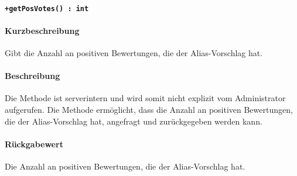 \paragraph*{\texttt{+getPosVotes() : int}}%
\paragraph*{Kurzbeschreibung}
Gibt die Anzahl an positiven Bewertungen, die der Alias-Vorschlag hat.
\paragraph*{Beschreibung}
Die Methode ist serverintern und wird somit nicht explizit vom Administrator aufgerufen.
Die Methode ermöglicht, dass die Anzahl an positiven Bewertungen, die der Alias-Vorschlag hat, angefragt und zurückgegeben werden kann.
\paragraph*{Rückgabewert}
Die Anzahl an positiven Bewertungen, die der Alias-Vorschlag hat.

